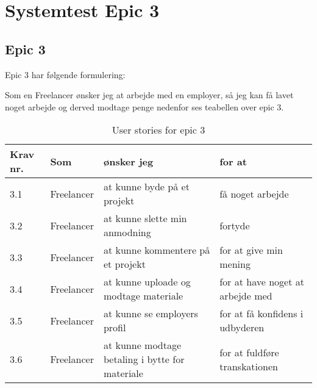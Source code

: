 \chapter{Systemtest Epic 3}
\section{Epic 3}
Epic 3 har følgende formulering:

Som en Freelancer ønsker jeg at arbejde med en employer, så jeg kan få lavet noget arbejde og derved modtage penge
nedenfor ses teabellen over epic 3.

\begin{table}[H]
    \centering
    \caption{User stories for epic 3}
    \label{tab:us-epic3}
    \begin{tabular}{p{1cm}|p{2cm}|p{6cm}|p{6cm}}
        \textbf{Krav nr.} & \textbf{Som} & \textbf{ønsker jeg}                             & \textbf{for at}                  \\
        \hline
        3.1               & Freelancer   & at kunne byde på et projekt                     & få noget arbejde                 \\
        \hline
        3.2               & Freelancer   & at kunne slette min anmodning                   & fortyde                          \\
        \hline
        3.3               & Freelancer   & at kunne kommentere på et projekt               & for at give min mening           \\
        \hline
        3.4               & Freelancer   & at kunne uploade og modtage materiale           & for at have noget at arbejde med \\
        \hline
        3.5               & Freelancer   & at kunne se employers profil                    & for at få konfidens i udbyderen  \\
        \hline
        3.6               & Freelancer   & at kunne modtage betaling i bytte for materiale & for at fuldføre transkationen    \\
    \end{tabular}
\end{table}




